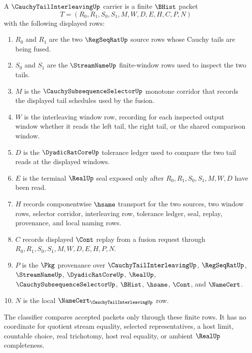 \begin{definition}
\label{def:cauchy-tail-interleaving-carrier}
A $\CauchyTailInterleavingUp$ carrier is a finite $\BHist$ packet
$$
T=(R_0,R_1,S_0,S_1,M,W,D,E,H,C,P,N)
$$
with the following displayed rows:
\begin{enumerate}
\item $R_0$ and $R_1$ are the two $\RegSeqRatUp$ source rows whose Cauchy tails are being fused.
\item $S_0$ and $S_1$ are the $\StreamNameUp$ finite-window rows used to inspect the two tails.
\item $M$ is the $\CauchySubsequenceSelectorUp$ monotone corridor that records the displayed tail schedules used by the fusion.
\item $W$ is the interleaving window row, recording for each inspected output window whether it reads the left tail, the right tail, or the shared comparison window.
\item $D$ is the $\DyadicRatCoreUp$ tolerance ledger used to compare the two tail reads at the displayed windows.
\item $E$ is the terminal $\RealUp$ seal exposed only after $R_0,R_1,S_0,S_1,M,W,D$ have been read.
\item $H$ records componentwise $\hsame$ transport for the two sources, two window rows, selector corridor, interleaving row, tolerance ledger, seal, replay, provenance, and local naming rows.
\item $C$ records displayed $\Cont$ replay from a fusion request through $R_0,R_1,S_0,S_1,M,W,D,E,H,P,N$.
\item $P$ is the $\Pkg$ provenance over $\CauchyTailInterleavingUp$, $\RegSeqRatUp$, $\StreamNameUp$, $\DyadicRatCoreUp$, $\RealUp$, $\CauchySubsequenceSelectorUp$, $\BHist$, $\hsame$, $\Cont$, and $\NameCert$.
\item $N$ is the local $\NameCert_{\CauchyTailInterleavingUp}$ row.
\end{enumerate}
The classifier compares accepted packets only through these finite rows. It has no coordinate for quotient stream equality, selected representatives, a host limit, countable choice, real trichotomy, host real equality, or ambient $\RealUp$ completeness.
\end{definition}

